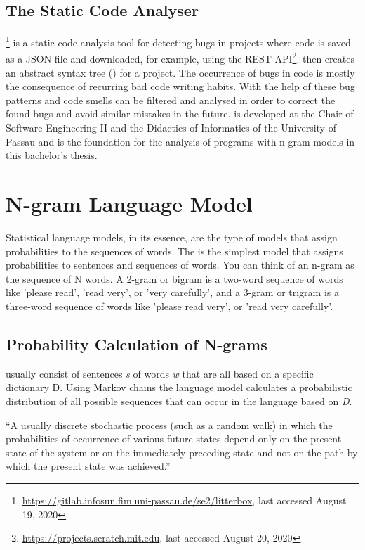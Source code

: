 \subsection{The Static \scratch{} Code Analyser \litterbox{}}\label{subsec:litterbox}
\litterbox{}\footnote{\url{https://gitlab.infosun.fim.uni-passau.de/se2/litterbox}, last accessed August 19, 2020} is a static code analysis tool for detecting bugs in \scratch{} projects where \scratch{} code is saved as a JSON file and downloaded, for example, using the \scratch{} REST API\footnote{\url{https://projects.scratch.mit.edu}, last accessed August 20, 2020}. \litterbox{} then creates an abstract syntax tree (\AST{}) for a \scratch{} project. The occurrence of bugs in code is mostly the consequence of recurring bad code writing habits. With the help of \litterbox{} these bug patterns and code smells can be filtered and analysed in order to correct the found bugs and avoid similar mistakes in the future. \litterbox{} is developed at the Chair of Software Engineering II and the Didactics of Informatics of the University of Passau and is the foundation for the analysis of \scratch{} programs with n-gram models in this bachelor's thesis. 


\section{N-gram Language Model}\label{sec:language-models}
Statistical language models, in its essence, are the type of models that assign probabilities to the sequences of words. The \ngram{} is the simplest model that assigns probabilities to sentences and sequences of words. You can think of an n-gram as the sequence of N words. A 2-gram or bigram is a two-word sequence of words like 'please read', 'read very', or 'very carefully', and a 3-gram or trigram is a three-word sequence of words like 'please read very', or 'read very carefully'. 

\subsection{Probability Calculation of N-grams}\label{subsec:ngram}
 usually consist of sentences \textit{s} of words \textit{w} that are all based on a specific dictionary {D}. Using \hyperref[def:markov_chain]{Markov chains} the language model calculates a  probabilistic distribution of all possible sequences that can occur in the language based on \textit{D}.

\begin{definition}\label{def:markov_chain}
    ``A usually discrete stochastic process (such as a random walk) in which the probabilities of occurrence of various future states depend only on the present state of the system or on the immediately preceding state and not on the path by which the present state was achieved.''~\cite{markov_chain}
\end{definition} 

